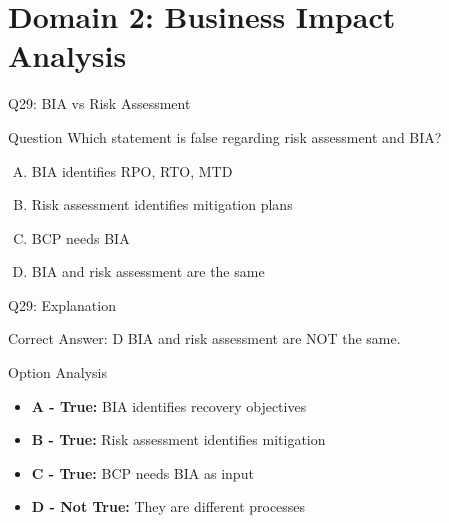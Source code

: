 \documentclass{beamer}
\begin{document}
	\section{Domain 2: Business Impact Analysis}
	
	\begin{frame}{Q29: BIA vs Risk Assessment}
		\begin{block}{Question}
			Which statement is false regarding risk assessment and BIA?
		\end{block}
		\begin{enumerate}[(A)]
			\item BIA identifies RPO, RTO, MTD
			\item Risk assessment identifies mitigation plans
			\item BCP needs BIA
			\item BIA and risk assessment are the same
		\end{enumerate}
	\end{frame}
	
	\begin{frame}{Q29: Explanation}
		\begin{block}{Correct Answer: D}
			BIA and risk assessment are NOT the same.
		\end{block}
		\begin{block}{Option Analysis}
			\begin{itemize}
				\item \textbf{A - True:} BIA identifies recovery objectives
				\item \textbf{B - True:} Risk assessment identifies mitigation
				\item \textbf{C - True:} BCP needs BIA as input
				\item \textbf{D - Not True:} They are different processes
			\end{itemize}
		\end{block}
	\end{frame}
	
	
	
\end{document}
